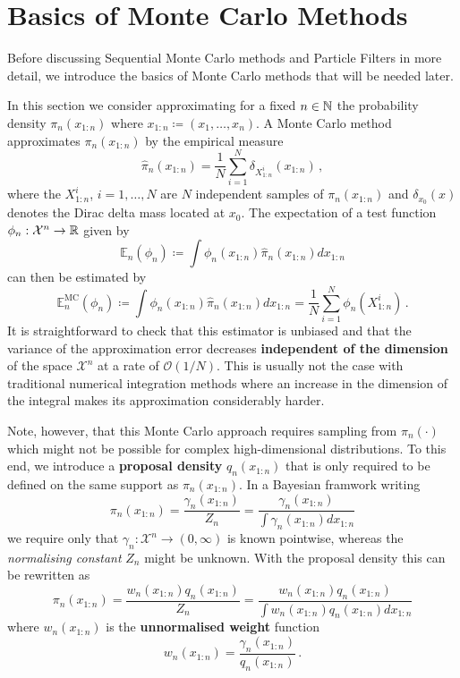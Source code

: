 \documentclass[
fontsize=11pt,
paper=a4,
numbers=noenddot,
parskip=full
]{scrartcl}
\begin{document}
\section*{Basics of Monte Carlo Methods}
Before discussing Sequential Monte Carlo methods and Particle Filters
in more detail, we introduce the basics of Monte Carlo methods that
will be needed later.

In this section we consider approximating for a fixed $n \in \mathbb{N}$ the
probability density $\pi_n(x_{1 : n})$ where
$x_{1:n} \coloneqq (x_1, \dotsc, x_n)$. A Monte Carlo method
approximates $\pi_n(x_{1:n})$ by the empirical measure
\[
  \hat{\pi}_n(x_{1:n}) = \frac{1}{N} \sum_{i = 1}^N
  \delta_{X_{1:n}^i}(x_{1:n})\,,
\]
where the $X_{1:n}^i$, $i = 1, \dotsc, N$ are $N$ independent samples
of $\pi_n(x_{1:n})$ and $\delta_{x_0}(x)$ denotes the Dirac delta mass
located at $x_0$. The expectation of a test function
$\phi_n : \mathcal{X}^n \rightarrow \mathbb{R}$ given by
\[
  \mathbb{E}_n(\phi_n) \coloneqq \int \phi_n(x_{1:n})
  \hat{\pi}_n(x_{1:n}) dx_{1:n}
\]
can then be estimated by
\[
  \mathbb{E}_n^{\text{MC}}(\phi_n) \coloneqq \int \phi_n(x_{1:n})
  \hat{\pi}_n(x_{1:n}) dx_{1:n} = \frac{1}{N} \sum_{i=1}^N
  \phi_n(X_{1:n}^i) \,.
\]
It is straightforward to check that this estimator is unbiased and
that the variance of the approximation error decreases
\textbf{independent of the dimension} of the space $\mathcal{X}^n$ at
a rate of $\mathcal{O}(1/N)$. This is usually not the case with
traditional numerical integration methods where an increase in the
dimension of the integral makes its approximation considerably harder.

Note, however, that this Monte Carlo approach requires sampling from
$\pi_n(\cdot)$ which might not be possible for complex
high-dimensional distributions. To this end, we introduce a
\textbf{proposal density} $q_n(x_{1:n})$ that is only required to be
defined on the same support as $\pi_n(x_{1:n})$. In a Bayesian
framwork writing
\[
  \pi_n(x_{1:n}) = \frac{\gamma_n(x_{1:n})}{Z_n} =
  \frac{\gamma_n(x_{1:n})}{\int \gamma_n(x_{1:n}) dx_{1:n}}
\]
we require only that
$\gamma_n : \mathcal{X}^n \rightarrow (0, \infty)$ is known pointwise,
whereas the \emph{normalising constant} $Z_n$ might be unknown. With
the proposal density this can be rewritten as
\begin{equation}
  \label{eq:is:density}
  \pi_n(x_{1:n}) = \frac{w_n(x_{1:n})q_n(x_{1:n})}{Z_n} = \frac{w_n(x_{1:n})q_n(x_{1:n})}{\int w_n(x_{1:n})q_n(x_{1:n})dx_{1:n}}
\end{equation}
where $w_n(x_{1:n})$ is the \textbf{unnormalised weight} function
\[
  w_n(x_{1:n}) = \frac{\gamma_n(x_{1:n})}{q_n(x_{1:n})}\,.
\]
\end{document}
